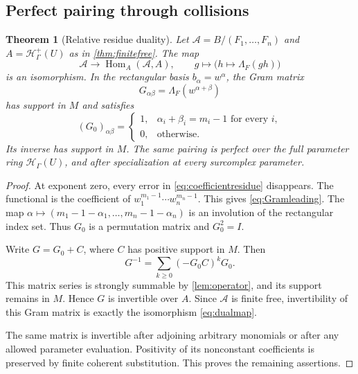 \documentclass[11pt,oneside]{article}
\numberwithin{equation}{section}
\newtheorem{theorem}{Theorem}[section]
\theoremstyle{definition}
\theoremstyle{remark}\newtheorem{remark}[theorem]{Remark}
\newcommand{\HH}{\mathcal H_{\Gamma}}
\newcommand{\Hp}{\mathcal H^{+}_{\Gamma}}
\newcommand{\Hom}{\operatorname{Hom}}
\begin{document}
\subsection{Perfect pairing through collisions}
\begin{theorem}[Relative residue duality]\label{thm:duality}
Let \(\mathcal A=B/(F_1,\ldots,F_n)\) and \(A=\Hp(U)\) as in \cref{thm:finitefree}. The map
\begin{equation}\label{eq:dualmap}
 \mathcal A\longrightarrow\Hom_A(\mathcal A,A),
 \qquad g\longmapsto\bigl(h\longmapsto\Lambda_F(gh)\bigr)
\end{equation}
is an isomorphism. In the rectangular basis \(b_\alpha=w^\alpha\), the Gram matrix
\[
 G_{\alpha\beta}=\Lambda_F(w^{\alpha+\beta})
\]
has support in \(M\) and satisfies
\begin{equation}\label{eq:Gramleading}
 (G_0)_{\alpha\beta}=
 \begin{cases}
 1,&\alpha_i+\beta_i=m_i-1\text{ for every }i,\\
 0,&\text{otherwise}.
 \end{cases}
\end{equation}
Its inverse has support in \(M\). The same pairing is perfect over the full parameter ring \(\HH(U)\), and after specialization at every surcomplex parameter.
\end{theorem}
\begin{proof}
At exponent zero, every error in \eqref{eq:coefficientresidue} disappears. The functional is the coefficient of \(w_1^{m_1-1}\cdots w_n^{m_n-1}\). This gives \eqref{eq:Gramleading}. The map
\(\alpha\mapsto(m_1-1-\alpha_1,\ldots,m_n-1-\alpha_n)\)
is an involution of the rectangular index set. Thus \(G_0\) is a permutation matrix and \(G_0^2=I\).

Write \(G=G_0+C\), where \(C\) has positive support in \(M\). Then
\begin{equation}\label{eq:Graminverse}
 G^{-1}=\sum_{k\geq0}(-G_0C)^kG_0.
\end{equation}
This matrix series is strongly summable by \cref{lem:operator}, and its support remains in \(M\). Hence \(G\) is invertible over \(A\). Since \(\mathcal A\) is finite free, invertibility of this Gram matrix is exactly the isomorphism \eqref{eq:dualmap}.

The same matrix is invertible after adjoining arbitrary monomials or after any allowed parameter evaluation. Positivity of its nonconstant coefficients is preserved by finite coherent substitution. This proves the remaining assertions.
\end{proof}
\end{document}
